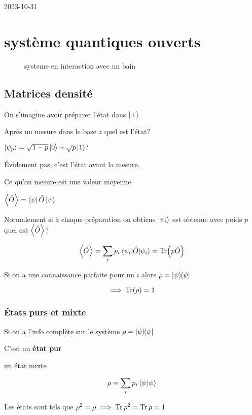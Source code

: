 


2023-10-31

\setcounter{section}{4}

\section{système quantiques ouverts}


\begin{figure}[ht]
    \centering
    \caption{systeme en interaction avec un bain}
    \label{fig:systeme-en-interaction-avec-un-bain}
\end{figure}

\subsection{Matrices densité}

On s'imagine avoir préparer l'état dans $\ket{+}$


Après un mesure dans le base $z$ quel est l'état?

$\ket{\psi_{p}} = \sqrt{1-p}\ket{0} + \sqrt{p}\ket{1}?$

Évidement pas, c'est l'état avant la mesure.

Ce qu'on mesure est une valeur moyenne

$\expval{\hat O} = \bra{\psi}\hat O \ket{\psi}$

Normalement si à chaque préparation on obtiens $\ket{\psi_i}$ est obtenue avec poids $p$ quel est $\expval{\hat O}$?

\[ \expval{\hat O}  =\sum_i p_i \expval{\hat O}{\psi_{i}} = \Tr(p \hat O) \]

Si on a une connaissance parfaite pour un $i$ alors $\rho = \ketbra{\psi}$

\[ \implies \Tr(\rho) =1 \]


\subsubsection{États purs et mixte}

Si on a l'info complète sur le système $\rho = \ketbra{\psi}$

C'est un \textbf{état pur}

un état mixte

\[ \rho = \sum_i p_i \braket{\psi} \]

Les états sont tels que $\rho^{2}= \rho\implies \Tr \rho^{2}= \Tr \rho =1$

